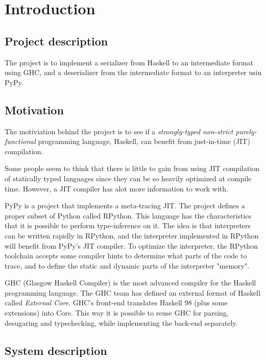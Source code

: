 
\section{Introduction}

\subsection{Project description}

The project is to implement a serializer from Haskell to an intermediate
format using GHC, and a deserializer from the intermediate format to an
interpreter usin PyPy.

\subsection{Motivation}

The motiviation behind the project is to see if a \emph{strongly-typed} 
\emph{non-strict} \emph{purely-functional} programming language, Haskell, 
can benefit from just-in-time (JIT) compilation.

Some people seem to think that there is little to gain from using 
JIT compilation of statically typed languages since they can be
so heavily optimized at compile time. However, a JIT compiler has alot
more information to work with.

PyPy is a project that implements a meta-tracing JIT. The project
defines a proper subset of Python called RPython. This language has 
the characteristics that it is possible to perform type-inference on it.
The idea is that interpreters can be written rapidly in RPython, and the
interpreter implemented in RPython will benefit from PyPy's JIT compiler.
To optimize the interpreter, the RPython toolchain accepts some compiler
hints to determine what parts of the code to trace, and to define the 
static and dynamic parts of the interpreter "memory".

GHC (Glasgow Haskell Compiler) is the most advanced compiler for the
Haskell programming language. The GHC team has defined an external format
of Haskell called \emph{External Core}. GHC's front-end translates
Haskell 98 (plus some extensions) into Core. This way it is possible to
reuse GHC for parsing, desugaring and typechecking, while implementing
the back-end separately. \cite{tolmach2010ghc}

\subsection{System description}

